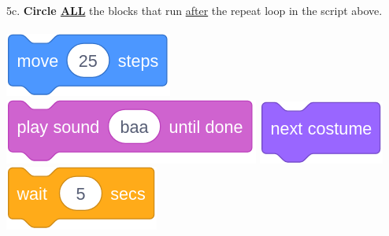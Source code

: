 \documentclass[letterpaper,12pt]{article}
\begin{document}
\noindent 5c. \textbf{Circle \underline{ALL}} the blocks that run \underline{after} the repeat loop in the script above. \\ \\
\includegraphics[scale=.3]{q5_script1.png} \hspace{1cm}
\includegraphics[scale=.3]{q5_script2.png} \hspace{1cm}
\includegraphics[scale=.3]{q5_script3.png} \hspace{1cm}
\includegraphics[scale=.3]{q5_script4.png} \hspace{1cm}\\

\noindent \dotfill \\

\newpage
\end{document}
